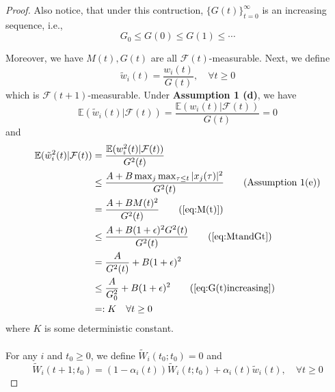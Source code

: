 \begin{proof}
Also notice, that under this contruction, $\{G(t)\}_{t=0}^\infty$ is an increasing sequence, i.e.,
\begin{equation}
    G_0\le G(0) \le G(1) \le \cdots
\end{equation}\label{eq:G(t)increasing}

Moreover, we have $M(t),G(t)$ are all $\mathcal{F}(t)$-measurable. Next, we define
$$
\tilde w_i(t) = \frac{w_i(t)}{G(t)},\quad \forall t\ge 0
$$
which is $\mathcal{F}(t+1)$-measurable. Under \textbf{Assumption 1 (d)}, we have
$$
\mathbb{E}(\tilde w_i(t)|\mathcal{F}(t)) = \frac{\mathbb{E}(w_i(t)|\mathcal{F}(t))}{G(t)} = 0
$$
and
\begin{align*}
    \mathbb{E}(\tilde w_i^2(t)|\mathcal{F}(t)) &= \frac{\mathbb{E}(w_i^2(t)|\mathcal{F}(t))}{G^2(t)}\\
    &\le \frac{A + B \max_j\max_{\tau\le t}|x_j(\tau)|^2}{G^2(t)}\tag{Assumption 1(e)}\\
    &= \frac{A + B M(t)^2}{G^2(t)}\tag{\autoref{eq:M(t)}}\\
    &\le \frac{A+B(1+\epsilon)^2G^2(t)}{G^2(t)}\tag{\autoref{eq:MtandGt}}\\
    &= \frac{A}{G^2(t)} + B(1+\epsilon)^2 \\
    &\le \frac{A}{G_0^2} + B(1+\epsilon)^2 \tag{\autoref{eq:G(t)increasing}}\\
    &=:K\quad \forall t\ge 0
\end{align*}
where $K$ is some deterministic constant.\\
\\
For any $i$ and $t_0\ge 0$, we define $\tilde W_i(t_0;t_0) = 0$ and
\begin{equation}\label{eq:tildeW}
    \tilde W_i(t+1; t_0) = (1-\alpha_i(t))\tilde W_i(t;t_0) + \alpha_i(t)\tilde w_i(t),\quad \forall t\ge 0
\end{equation}


\end{proof}
